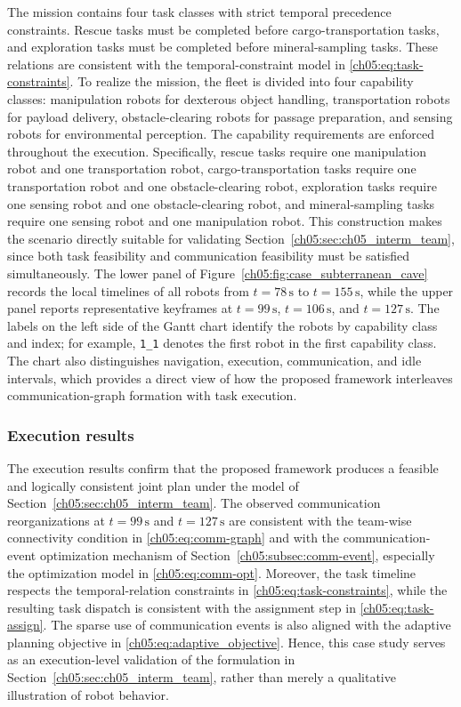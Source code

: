 The mission contains four task classes with strict temporal
precedence constraints. Rescue tasks must be completed before
cargo-transportation tasks, and exploration tasks must be
completed before mineral-sampling tasks. These relations are
consistent with the temporal-constraint model in
\eqref{ch05:eq:task-constraints}. To realize the mission, the
fleet is divided into four capability classes: manipulation
robots for dexterous object handling, transportation robots for
payload delivery, obstacle-clearing robots for passage
preparation, and sensing robots for environmental perception.
The capability requirements are enforced throughout the
execution. Specifically, rescue tasks require one manipulation
robot and one transportation robot, cargo-transportation tasks
require one transportation robot and one obstacle-clearing
robot, exploration tasks require one sensing robot and one
obstacle-clearing robot, and mineral-sampling tasks require one
sensing robot and one manipulation robot. This construction
makes the scenario directly suitable for validating
Section~\ref{ch05:sec:ch05_interm_team}, since both task
feasibility and communication feasibility must be satisfied
simultaneously.
The lower panel of
Figure~\ref{ch05:fig:case_subterranean_cave} records the local
timelines of all robots from $t=78\,\mathrm{s}$ to
$t=155\,\mathrm{s}$, while the upper panel reports
representative keyframes at $t=99\,\mathrm{s}$,
$t=106\,\mathrm{s}$, and $t=127\,\mathrm{s}$. The labels on
the left side of the Gantt chart identify the robots by
capability class and index; for example, \texttt{1\_1} denotes
the first robot in the first capability class. The chart also
distinguishes navigation, execution, communication, and idle
intervals, which provides a direct view of how the proposed
framework interleaves communication-graph formation with
task execution.

\subsubsection{Execution results}
\label{ch05:subsubsec:case_subterranean_cave_results}

The execution results confirm that the proposed framework
produces a feasible and logically consistent joint plan under
the model of Section~\ref{ch05:sec:ch05_interm_team}. The
observed communication reorganizations at $t=99\,\mathrm{s}$
and $t=127\,\mathrm{s}$ are consistent with the team-wise
connectivity condition in \eqref{ch05:eq:comm-graph} and with
the communication-event optimization mechanism of
Section~\ref{ch05:subsec:comm-event}, especially the
optimization model in \eqref{ch05:eq:comm-opt}. Moreover, the
task timeline respects the temporal-relation constraints in
\eqref{ch05:eq:task-constraints}, while the resulting task
dispatch is consistent with the assignment step in
\eqref{ch05:eq:task-assign}. The sparse use of communication
events is also aligned with the adaptive planning objective in
\eqref{ch05:eq:adaptive_objective}. Hence, this case study
serves as an execution-level validation of the formulation in
Section~\ref{ch05:sec:ch05_interm_team}, rather than merely a
qualitative illustration of robot behavior.

